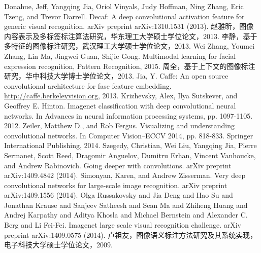 \begin{thebibliography}{99}
Donahue, Jeff, Yangqing Jia, Oriol Vinyals, Judy Hoffman, Ning Zhang, Eric Tzeng, and Trevor Darrell. Decaf: A deep convolutional activation feature for generic visual recognition. arXiv preprint arXiv:1310.1531 (2013).
赵雅昕，图像内容表示及多标签标注算法研究，华东理工大学硕士学位论文，2013.
李静，基于多特征的图像标注研究，武汉理工大学硕士学位论文，2013.
Wei Zhang, Youmei Zhang, Lin Ma, Jingwei Guan, Shijie Gong. Multimodal learning for facial expression recognition, Pattern Recognition, 2015.
周全，基于上下文的图像标注研究，华中科技大学博士学位论文，2013.
Jia, Y. Caffe: An open source convolutional architecture for fase feature embedding. \url{http://caffe.berkeleyvision.org}, 2013.
Krizhevsky, Alex, Ilya Sutskever, and Geoffrey E. Hinton. Imagenet classification with deep convolutional neural networks. In Advances in neural information processing systems, pp. 1097-1105. 2012.
Zeiler, Matthew D., and Rob Fergus. Visualizing and understanding convolutional networks. In Computer Vision–ECCV 2014, pp. 818-833. Springer International Publishing, 2014.
Szegedy, Christian, Wei Liu, Yangqing Jia, Pierre Sermanet, Scott Reed, Dragomir Anguelov, Dumitru Erhan, Vincent Vanhoucke, and Andrew Rabinovich. Going deeper with convolutions. arXiv preprint arXiv:1409.4842 (2014).
Simonyan, Karen, and Andrew Zisserman. Very deep convolutional networks for large-scale image recognition. arXiv preprint arXiv:1409.1556 (2014).
Olga Russakovsky and Jia Deng and Hao Su and Jonathan Krause and Sanjeev Satheesh and Sean Ma and Zhiheng Huang and Andrej Karpathy and Aditya Khosla and Michael Bernstein and Alexander C. Berg and Li Fei-Fei. Imagenet large scale visual recognition challenge. arXiv preprint arXiv:1409.0575 (2014).
卢祖友，图像语义标注方法研究及其系统实现，电子科技大学硕士学位论文，2009.
\end{thebibliography}


